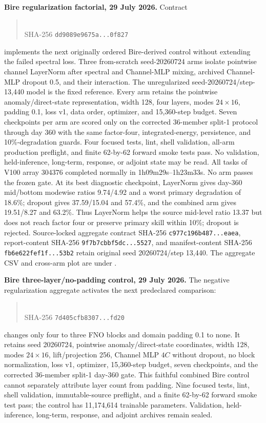 \documentclass[11pt]{article}
\begin{document}
\textbf{Bire regularization factorial, 29 July 2026.}  Contract
\begin{quote}
\\
SHA-256 \texttt{dd9089e9675a...0f827}
\end{quote}
implements the next originally ordered Bire-derived control without extending
the failed spectral loss.  Three from-scratch seed-20260724 arms isolate
pointwise channel LayerNorm after spectral and Channel-MLP mixing, archived
Channel-MLP dropout 0.5, and their interaction.  The unregularized
seed-20260724/step-13,440 model is the fixed reference.  Every arm retains the
pointwise anomaly/direct-state representation, width 128, four layers,
modes \(24\times16\), padding 0.1, loss v1, data order, optimizer, and
15,360-step budget.  Seven checkpoints per arm are scored only on the corrected
36-member split-1 protocol through day 360 with the same factor-four,
integrated-energy, persistence, and 10\%-degradation guards.  Four focused
tests, lint, shell validation, all-arm production preflight, and finite
62-by-62 forward smoke tests pass.  No validation, held-inference, long-term,
response, or adjoint state may be read.  All tasks of V100 array 304376
completed normally in 1h09m29s--1h23m33s.  No arm passes the frozen gate.
At its best diagnostic checkpoint, LayerNorm gives day-360 mid/bottom
modewise ratios 9.74/4.92 and a worst primary degradation of 18.6\%;
dropout gives 37.59/15.04 and 57.4\%, and the combined arm gives
19.51/8.27 and 63.2\%.  Thus LayerNorm helps the source mid-level ratio
13.37 but does not reach factor four or preserve primary skill within 10\%;
dropout is rejected.  Source-locked aggregate contract SHA-256
\texttt{c977c196b487...eaea}, report-content SHA-256
\texttt{9f7b7cbbf5dc...5527}, and manifest-content SHA-256
\texttt{fb6e622fef1f...53b2} retain original seed 20260724/step 13,440.
The aggregate CSV and cross-arm plot are under
.

\textbf{Bire three-layer/no-padding control, 29 July 2026.}  The negative
regularization aggregate activates the next predeclared comparison:
\begin{quote}
\\
SHA-256 \texttt{7d405cfb8307...fd20}
\end{quote}
changes only four to three FNO blocks and domain padding 0.1 to none.  It
retains seed 20260724, pointwise anomaly/direct-state coordinates, width 128,
modes \(24\times16\), lift/projection 256, Channel MLP \(4C\) without
dropout, no block normalization, loss v1, optimizer, 15,360-step budget,
seven checkpoints, and the corrected 36-member split-1 day-360 gate.  This
faithful combined Bire control cannot separately attribute layer count from
padding.  Nine focused tests, lint, shell validation, immutable-source
preflight, and a finite 62-by-62 forward smoke test pass; the control has
11,174,614 trainable parameters.  Validation, held-inference, long-term,
response, and adjoint archives remain sealed.
\end{document}
